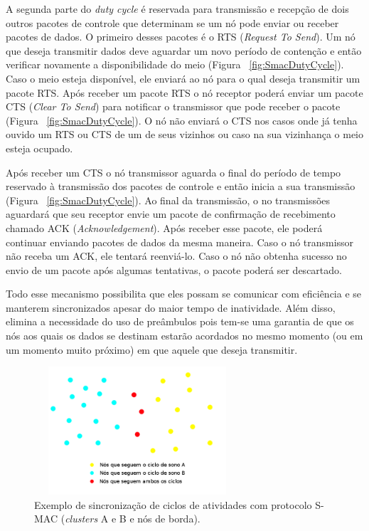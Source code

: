 A segunda parte do \emph{duty cycle} é reservada para transmissão e recepção de dois outros pacotes de controle que determinam se um nó pode enviar ou receber pacotes de dados. O primeiro desses pacotes é o RTS (\emph{Request To Send}). Um nó que deseja transmitir dados deve aguardar um novo período de contenção e então verificar novamente a disponibilidade do meio (Figura ~\ref{fig:SmacDutyCycle}). Caso o meio esteja disponível, ele enviará ao nó para o qual deseja transmitir um pacote RTS. Após receber um pacote RTS o nó receptor poderá enviar um pacote CTS (\emph{Clear To Send}) para notificar o transmissor que pode receber o pacote (Figura ~\ref{fig:SmacDutyCycle}). O nó não enviará o CTS nos casos onde já tenha ouvido um RTS ou CTS de um de seus vizinhos ou caso na sua vizinhança o meio esteja ocupado.

Após receber um CTS o nó transmissor aguarda o final do período de tempo reservado à transmissão dos pacotes de controle e então inicia a sua transmissão (Figura ~\ref{fig:SmacDutyCycle}). Ao final da transmissão, o no transmissões aguardará que seu receptor envie um pacote de confirmação de recebimento chamado ACK (\emph{Acknowledgement}). Após receber esse pacote, ele poderá continuar enviando pacotes de dados da mesma maneira. Caso o nó transmissor não receba um ACK, ele tentará reenviá-lo. Caso o nó não obtenha sucesso no envio de um pacote após algumas tentativas, o pacote poderá ser descartado.

Todo esse mecanismo possibilita que eles possam se comunicar com eficiência e se manterem sincronizados apesar do maior tempo de inatividade. Além disso, elimina a necessidade do uso de preâmbulos pois tem-se uma garantia de que os nós aos quais os dados se destinam estarão acordados no mesmo momento (ou em um momento muito próximo) em que aquele que deseja transmitir.

\begin{figure}[!htb]
\centering
\includegraphics[width=290px,height=180px]{./Pictures/S-MACSynchronization.png}
\caption{Exemplo de sincronização de ciclos de atividades com protocolo S-MAC (\emph{clusters} A e B e nós de borda).} %
\label{fig:SmacSynch} %
\end{figure}
 
